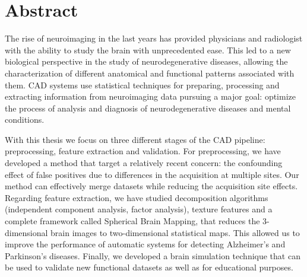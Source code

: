 \begingroup

\chapter*{Abstract}
The rise of neuroimaging in the last years has provided physicians and radiologist with the ability to study the brain with unprecedented ease. This led to a new biological perspective in the study of neurodegenerative diseases, allowing the characterization of different anatomical and functional patterns associated with them. \acf{CAD} systems use statistical techniques for preparing, processing and extracting information from neuroimaging data pursuing a major goal: optimize the process of analysis and diagnosis of neurodegenerative diseases and mental conditions.

With this thesis we focus on three different stages of the \acf{CAD} pipeline: preprocessing, feature extraction and validation. For preprocessing, we have developed a method that target a relatively recent concern: the confounding effect of false positives due to differences in the acquisition at multiple sites. Our method can effectively merge datasets while reducing the acquisition site effects. Regarding feature extraction, we have studied decomposition algorithms (independent component analysis, factor analysis), texture features and a complete framework called Spherical Brain Mapping, that reduces the 3-dimensional brain images to two-dimensional statistical maps. This allowed us to improve the performance of automatic systems for detecting Alzheimer's and Parkinson's diseases. Finally, we developed a brain simulation technique that can be used to validate new functional datasets as well as for educational purposes. 

\endgroup			

\vfill